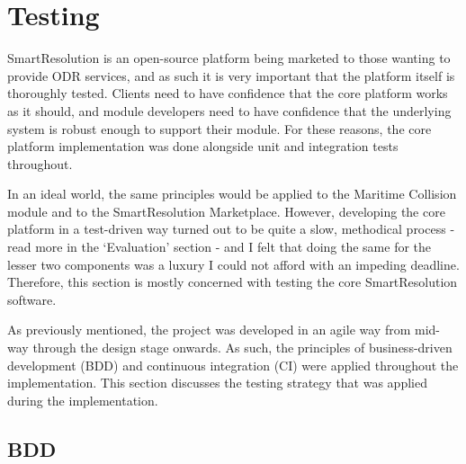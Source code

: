 \chapter{Testing} %

SmartResolution is an open-source platform being marketed to those wanting to provide ODR services, and as such it is very important that the platform itself is thoroughly tested. Clients need to have confidence that the core platform works as it should, and module developers need to have confidence that the underlying system is robust enough to support their module. For these reasons, the core platform implementation was done alongside unit and integration tests throughout.

In an ideal world, the same principles would be applied to the Maritime Collision module and to the SmartResolution Marketplace. However, developing the core platform in a test-driven way turned out to be quite a slow, methodical process - read more in the `Evaluation' section - and I felt that doing the same for the lesser two components was a luxury I could not afford with an impeding deadline. Therefore, this section is mostly concerned with testing the core SmartResolution software.

As previously mentioned, the project was developed in an agile way from mid-way through the design stage onwards. As such, the principles of business-driven development (BDD) and continuous integration (CI) were applied throughout the implementation. This section discusses the testing strategy that was applied during the implementation.

\section{BDD}

